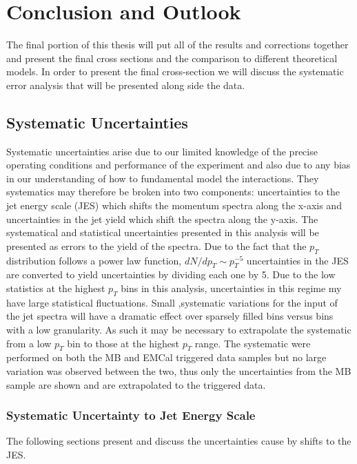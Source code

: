 \chapter{Conclusion and Outlook} \label{ch:cando}

The final portion of this thesis will put all of the results and corrections together and present the final cross sections and the comparison to different theoretical models.  In order to present the final cross-section we will discuss the systematic error analysis that will be presented along side the data.

\section{Systematic Uncertainties}

Systematic uncertainties arise due to our limited knowledge of the precise operating conditions and performance of the experiment and also due to any bias in our understanding of how to fundamental model the interactions.  They systematics may therefore be broken into two components: uncertainties to the jet energy scale (JES) which shifts the momentum spectra along the x-axis and uncertainties in the jet yield which shift the spectra along the y-axis.  The systematical and statistical uncertainties presented in this analysis will be presented as errors to the yield of the spectra.  Due to the fact that the $p_{T}$ distribution follows a power law function, $dN/dp_{T} \sim p_{T}^{-5}$ uncertainties in the JES are converted to yield uncertainties by dividing each one by 5.
Due to the low statistics at the highest $p_{T}$ bins in this analysis, uncertainties in this regime my have large statistical fluctuations.  Small ,systematic variations for the input of the jet spectra will have a dramatic effect over sparsely filled bins versus bins with a low granularity.  As such it may be necessary to extrapolate the systematic from a low $p_{T}$ bin to those at the highest $p_{T}$ range.  The systematic were performed on both the MB and EMCal triggered data samples but no large variation was observed between the two, thus only the uncertainties from the MB sample are shown and are extrapolated to the triggered data.


\subsection{Systematic Uncertainty to Jet Energy Scale}

The following sections present and discuss the uncertainties cause by shifts to the JES.

